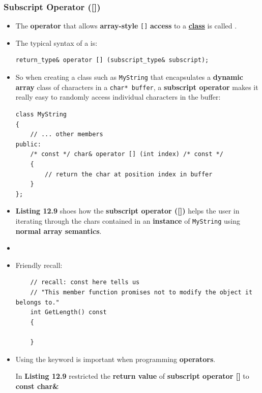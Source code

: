 \documentclass[10pt]{article}
\newcommand{\pbreak}{\vspace{30pt}}
\newcommand{\vocab}[1]{\fbox{\textbf{\textit{#1}}}}
\begin{document}
\newpage

\subsubsection{Subscript Operator ([])}
\begin{itemize}
	\item The \textbf{operator} that allows \textbf{array-style} \verb|[]| \textbf{access} to a \textbf{\underline{class}} is called \vocab{subscript operator}.

	\item The typical syntax of a  is:

		\begin{verbatim}
return_type& operator [] (subscript_type& subscript);
		\end{verbatim}

	\item So when creating a class such as \verb|MyString| that encapsulates a \textbf{dynamic array} class of characters in a \verb|char* buffer|, a \textbf{subscript operator} makes it really easy to randomly access individual characters in the buffer:

		\begin{verbatim}
class MyString
{
	// ... other members
public:
	/* const */ char& operator [] (int index) /* const */
	{
		// return the char at position index in buffer
	}
};
		\end{verbatim}

	\item \textbf{Listing 12.9} shoes how the \textbf{subscript operator ([])} helps the user in iterating through the chars contained in an \textbf{instance} of \verb|MyString| using \textbf{normal array semantics}.

	\item {}

		\pbreak

	\item Friendly recall:
	\begin{verbatim}
	// recall: const here tells us
	// "This member function promises not to modify the object it belongs to."
	int GetLength() const 
	{

	}
	\end{verbatim}

\item Using the keyword  is important when programming \textbf{operators}.

	In \textbf{Listing 12.9} restricted the \textbf{return value} of \textbf{subscript operator []} to \textbf{const char\&}


\end{itemize}
\end{document}
